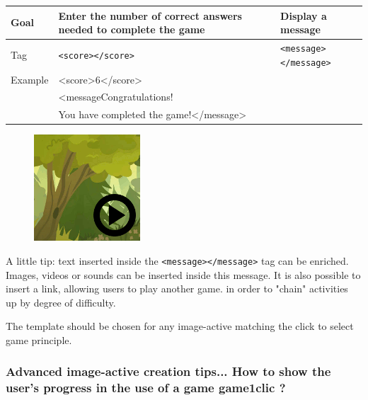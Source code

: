 \begin{center}
 \begin{tabular}{|l|p{2in}|p{2in}|}
 \hline
  Goal & Enter the number of correct answers needed to complete the game & Display a message\\
  \hline
  Tag & \verb|<score></score>| & \verb|<message></message>|\\
  \hline
  Example & \multicolumn{2}{|l|}{<score>6</score>}\\
   & \multicolumn{2}{|l|}{<messageCongratulations!}\\
    & \multicolumn{2}{|l|}{You have completed the game!</message>}\\
  \hline
 \end{tabular}
\end{center}

\begin{figure}
  \centering
  \includegraphics[scale=0.7]{./images/game1clic} 
\end{figure}

A little tip: text inserted inside the \verb|<message></message>| tag can be 
enriched. Images, videos or sounds can be inserted inside this message.
It is also possible to insert a link, allowing users to play another game.
in order to "chain" activities up by degree of difficulty.

The template  should be chosen for any image-active matching 
the click to select game principle.



\subsubsection{Advanced image-active creation tips... How to show the user's progress in the use of a game game1clic ?}\label{détail_progression}


